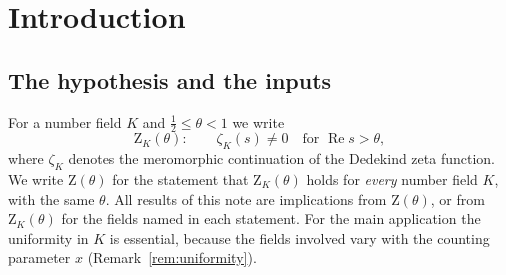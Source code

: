 \documentclass[11pt]{amsart}
\theoremstyle{definition}
\theoremstyle{remark}
\newcommand{\Zt}{\mathrm{Z}}       %
\begin{document}
\tableofcontents

\section{Introduction}\label{sec:intro}

\subsection{The hypothesis and the inputs}

For a number field $K$ and $\tfrac12\le\theta<1$ we write
\[
  \Zt_K(\theta):\qquad \zeta_K(s)\neq 0\quad\text{for } \operatorname{Re}s>\theta,
\]
where $\zeta_K$ denotes the meromorphic continuation of the Dedekind zeta function. We write $\Zt(\theta)$ for the
statement that $\Zt_K(\theta)$ holds for \emph{every} number field $K$, with the same $\theta$. All results of this
note are implications from $\Zt(\theta)$, or from $\Zt_K(\theta)$ for the fields named in each statement. For the main
application the uniformity in $K$ is essential, because the fields involved vary with the counting parameter $x$
(Remark~\ref{rem:uniformity}).
\end{document}
